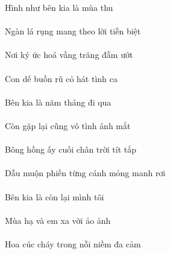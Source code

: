 \documentclass[14pt,a4paper]{extarticle}
\begin{document}
Hình như bên kia là mùa thu\\[1ex]
{\huge {}   \kia {}  \thu}\\[1ex]
Ngàn lá rụng mang theo lời tiễn biệt\\[1ex]
{\huge {}   \mang \theo {}  }\\[1ex]
Nơi ký ức hoá vầng trăng đẫm ướt\\[1ex]
{\huge {}       }\\[1ex]
Con dế buồn rũ cỏ hát tình ca\\[1ex]
{\huge \con {}      \ca}\\[1ex]
Bên kia là năm tháng đi qua\\[1ex]
{\huge {} \kia {}    \qua}\\[1ex]
Còn gặp lại cũng vô tình ánh mắt\\[1ex]
{\huge {}       }\\[1ex]
Bông hồng ấy cuối chân trời tít tắp\\[1ex]
{\huge {}       }\\[1ex]
Dẫu muộn phiền từng cánh mỏng manh rơi\\[1ex]
{\huge {}      \manh {}}\\[1ex]
Bên kia là còn lại mình tôi\\[1ex]
{\huge {} \kia {}    }\\[1ex]
Mùa hạ và em xa vời ảo ảnh\\[1ex]
{\huge {}   \em \xa {}  }\\[1ex]
Hoa cúc cháy trong nỗi niềm đa cảm\\[1ex]
{\huge \hoa {}  \trong {}   }\\[1ex]
\end{document}
